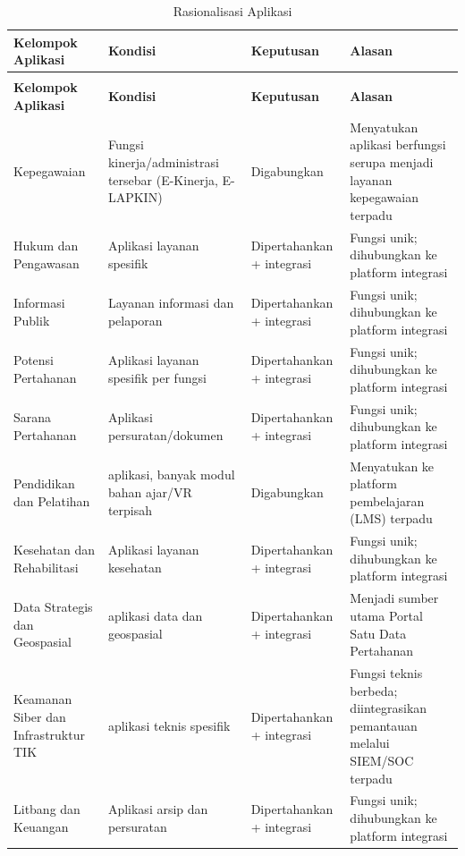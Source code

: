 {\small
\begin{longtable}{@{}>{\raggedright\arraybackslash}p{}>{\raggedright\arraybackslash}p{}>{\raggedright\arraybackslash}p{}>{\raggedright\arraybackslash}p{}@{}}
\caption{Rasionalisasi Aplikasi}
\label{tab:d4-18}\\
\toprule
\textbf{Kelompok Aplikasi} & \textbf{Kondisi} & \textbf{Keputusan} & \textbf{Alasan}\\
\midrule
\endfirsthead
\multicolumn{4}{@{}l}{\small\itshape \tablename\ \thetable{} (lanjutan)}\\
\toprule
\textbf{Kelompok Aplikasi} & \textbf{Kondisi} & \textbf{Keputusan} & \textbf{Alasan}\\
\midrule
\endhead
\bottomrule
\endlastfoot
Kepegawaian & Fungsi kinerja/administrasi tersebar (E-Kinerja, E-LAPKIN) & Digabungkan & Menyatukan aplikasi berfungsi serupa menjadi layanan kepegawaian terpadu\\
Hukum dan Pengawasan & Aplikasi layanan spesifik & Dipertahankan + integrasi & Fungsi unik; dihubungkan ke platform integrasi\\
Informasi Publik & Layanan informasi dan pelaporan & Dipertahankan + integrasi & Fungsi unik; dihubungkan ke platform integrasi\\
Potensi Pertahanan & Aplikasi layanan spesifik per fungsi & Dipertahankan + integrasi & Fungsi unik; dihubungkan ke platform integrasi\\
Sarana Pertahanan & Aplikasi persuratan/dokumen & Dipertahankan + integrasi & Fungsi unik; dihubungkan ke platform integrasi\\
Pendidikan dan Pelatihan & 27 aplikasi, banyak modul bahan ajar/VR terpisah & Digabungkan & Menyatukan ke platform pembelajaran (LMS) terpadu\\
Kesehatan dan Rehabilitasi & Aplikasi layanan kesehatan & Dipertahankan + integrasi & Fungsi unik; dihubungkan ke platform integrasi\\
Data Strategis dan Geospasial & 8 aplikasi data dan geospasial & Dipertahankan + integrasi & Menjadi sumber utama Portal Satu Data Pertahanan\\
Keamanan Siber dan Infrastruktur TIK & 16 aplikasi teknis spesifik & Dipertahankan + integrasi & Fungsi teknis berbeda; diintegrasikan pemantauan melalui SIEM/SOC terpadu\\
Litbang dan Keuangan & Aplikasi arsip dan persuratan & Dipertahankan + integrasi & Fungsi unik; dihubungkan ke platform integrasi\\
\end{longtable}
}

